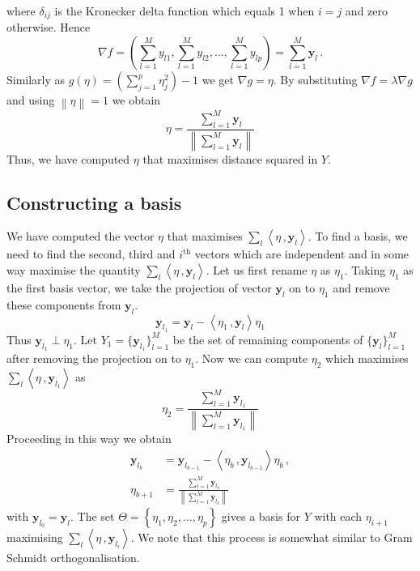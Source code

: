 \documentclass[a4paper,11pt]{article}
\begin{document}
where $\delta_{ij}$ is the Kronecker delta function which equals 1 when $i=j$ and zero otherwise. Hence
\begin{equation}\label{eq:secMF8}
    \nabla f = \left(\sum_{l=1}^M y_{l1}, \sum_{l=1}^M y_{l2}, \ldots, \sum_{l=1}^M y_{lp}   \right) = \sum_{l=1}^M \bm{y}_l \, .
\end{equation}
Similarly as $g(\eta) = \left( \sum_{j=1}^p \eta_j^2\right) - 1$  we get $\nabla g = \eta$. By substituting  $\nabla f = \lambda \nabla g$ and using $\left\lVert \eta \right\rVert = 1 $ we obtain
\begin{equation}\label{eq:secMF9}
    \eta = \frac{\sum_{l=1}^M \bm{y}_l }{  \left\lVert\sum_{l=1}^M \bm{y}_l  \right\rVert  }
\end{equation}
Thus, we have computed $\eta$ that maximises distance squared in $Y$.

\subsection{Constructing a basis}\label{sec:MathFrame3}
We have computed the vector $\eta$ that maximises $\sum_{l}\left\langle \eta\, ,  \bm{y}_{l} \right\rangle$. To find a basis,  we need to find the second, third and $i^{\text{th}}$ vectors which are independent and in some way maximise the quantity $\sum_{l}\left\langle \eta\, ,  \bm{y}_{l} \right\rangle$.  Let us first rename $\eta$ as $\eta_1$. Taking $\eta_1$ as the first basis vector, we take the projection of vector $\bm{y}_l$ on to $\eta_1$  and remove these components from $\bm{y}_l$.
\begin{equation}\label{eq:secMF10}
    \bm{y}_{l_1} = \bm{y}_l - \left\langle \eta_1 \, , \bm{y}_l \right \rangle \eta_1
\end{equation}
Thus $\bm{y}_{l_1} \perp \eta_1$. Let $Y_1 = \{\bm{y}_{l_1} \}_{l=1}^M $ be the set of remaining components of $\{ \bm{y}_l \}_{l=1}^M$ after removing the projection on to $\eta_1$. Now we can compute $\eta_2$ which maximises $\sum_{l}\left\langle \eta\, ,  \bm{y}_{l_1} \right\rangle$ as
\begin{equation}\label{eq:secMF11}
    \eta_2 = \frac{\sum_{l=1}^M \bm{y}_{l_1} }{  \left\lVert\sum_{l=1}^M \bm{y}_{l_1}  \right\rVert  }
\end{equation}
Proceeding in this way we obtain
\begin{align}
    \bm{y}_{l_{b}} & = \bm{y}_{l_{b-1}} - \left\langle \eta_b \, , \bm{y}_{l_{b-1}} \right \rangle \eta_b \, , \label{eq:secMF12} \\
     \eta_{b+1} & = \frac{\sum_{l=1}^M \bm{y}_{l_b} }{  \left\lVert\sum_{l=1}^M \bm{y}_{l_b}  \right\rVert  } \label{eq:secMF13}
\end{align}
with $\bm{y}_{l_0} = \bm{y}_{l}$. The set $\Theta = \left\{ \eta_1, \eta_2, \ldots , \eta_p  \right\}$ gives a basis for $Y$ with each $\eta_{i+1}$ maximising $\sum_{l}\left\langle \eta\, ,  \bm{y}_{l_i} \right\rangle$. %
We note that this process is somewhat similar to Gram Schmidt orthogonalisation.
\end{document}
